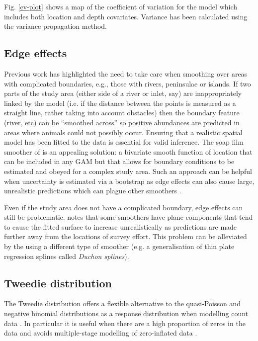 \documentclass[a4paper,12pt]{article}
\begin{document}
Fig. \ref{cv-plot} shows a map of the coefficient of variation for the model which includes both location and depth covariates. Variance has been calculated using the variance propagation method. 

\subsection*{Edge effects}
\label{s:leakage}

Previous work \citep{Ramsay:2002uo,Wang:2007tf,Wood:2008vo,ScottHayward:2011tc,Miller:2012tm} has highlighted the need to take care when smoothing over areas with complicated boundaries, e.g., those with rivers, peninsulae or islands. If two parts of the study area (either side of a river or inlet, say) are inappropriately linked by the model (i.e. if the distance between the points is measured as a straight line, rather taking into account obstacles) then the boundary feature (river, etc) can be ``smoothed across'' so positive abundances are predicted in areas where animals could not possibly occur. Ensuring that a realistic spatial model has been fitted to the data is essential for valid inference. The soap film smoother of \cite{Wood:2008vo} is an appealing solution: a bivariate smooth function of location that can be included in any GAM but that allows for boundary conditions to be estimated and obeyed for a complex study area. Such an approach can be helpful when uncertainty is estimated via a bootstrap as edge effects can also cause large, unrealistic predictions which can plague other smoothers \citep{Bravington:2009vo}.

Even if the study area does not have a complicated boundary, edge effects can still be problematic. \cite{Miller:2012wy} notes that some smoothers have plane components that tend to cause the fitted surface to increase unrealistically as predictions are made further away from the locations of survey effort. This problem can be alleviated by the using a different type of smoother (e.g. a generalisation of thin plate regression splines called \textit{Duchon splines}).

\subsection*{Tweedie distribution}
\label{s:Tweedie}

The Tweedie distribution offers a flexible alternative to the quasi-Poisson and negative binomial distributions as a response distribution when modelling count data \citep{Candy:2004tb}. In particular it is useful when there are a high proportion of zeros in the data \cite[][]{Shono:2008ge,Peel:2012jc} and avoids multiple-stage modelling of zero-inflated data \cite[as in][]{Barry:2002bm}.
\end{document}
